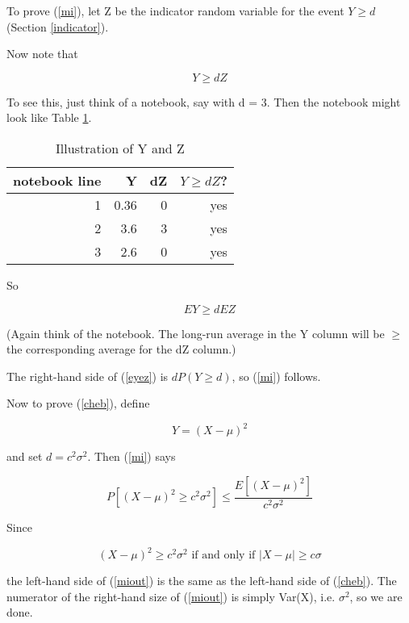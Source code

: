 To prove (\ref{mi}), let Z be the indicator random variable for the
event $Y \geq d$ (Section \ref{indicator}). 

Now note that

\begin{equation}
Y \geq d Z
\end{equation}

To see this, just think of a notebook, say with d = 3.  Then the
notebook might look like Table \ref{ygeqz}.

\begin{table}
\begin{center}
\vskip 0.5in

\begin{tabular}{|r|r|r|r|}
\hline
notebook line & Y & dZ & $Y \geq dZ$? \\ \hline
\hline
1 & 0.36 & 0 & yes \\ \hline
2 & 3.6 & 3 & yes \\ \hline
3 & 2.6 & 0 & yes \\ \hline
\end{tabular}

\end{center}
\caption{Illustration of Y and Z}
\label{ygeqz}
\end{table}

So

\begin{equation}
\label{eyez}
EY \geq d EZ
\end{equation}

(Again think of the notebook.  The long-run average in the Y column will
be $\geq$ the corresponding average for the dZ column.)

The right-hand side of (\ref{eyez}) is $d P(Y \geq d)$, so (\ref{mi})
follows.

Now to prove (\ref{cheb}), define

\begin{equation}
Y = (X-\mu)^2
\end{equation}

and set $d = c^2 \sigma^2$.  Then (\ref{mi}) says

\begin{equation}
\label{miout}
P [ (X-\mu)^2 \geq c^2 \sigma^2 ]
\leq 
\frac
{E [(X-\mu)^2]}
{c^2 \sigma^2}
\end{equation}

Since

\begin{equation}
(X-\mu)^2 \geq c^2 \sigma^2 \textrm{ if and only if }
|X-\mu| \geq c \sigma
\end{equation}

the left-hand side of (\ref{miout}) is the same as the left-hand side of
(\ref{cheb}).  The numerator of the right-hand size of (\ref{miout}) is
simply Var(X), i.e. $\sigma^2$, so we are done.

